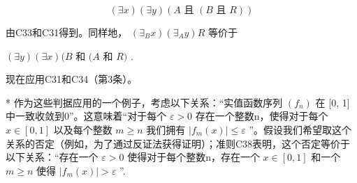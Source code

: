 \[
(\exists x) (\exists y) (A \text {   且   } (B \text {   且   } R))
\]

由C33和C31得到。同样地， \((\exists_{B}x)(\exists_{A}y)R\) 等价于

\((\exists y)(\exists x)(B\) 和 \((A\) 和 \(R)\) .

现在应用C31和C34（第3条）。

* 作为这些判据应用的一个例子，考虑以下关系：“实值函数序列 \((f_{n})\) 在 {[}0, 1{]}中一致收敛到0”。这意味着“对于每个 \(\varepsilon > 0\) 存在一个整数n，使得对于每个 \(x \in [0, 1]\) 以及每个整数 \(m \geqslant n\) 我们拥有 \(|f_{m}(x)| \leqslant \varepsilon\) ”。假设我们希望取这个关系的否定（例如，为了通过反证法获得证明）；准则C38表明，这个否定等价于以下关系：“存在一个 \(\varepsilon > 0\) 使得对于每个整数n，存在一个 \(x \in [0, 1]\) 和一个 \(m \geqslant n\) 使得 \(|f_{m}(x)| > \varepsilon\) ”.

